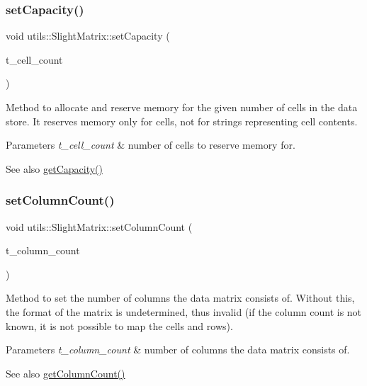 \subsubsection{\texorpdfstring{set\+Capacity()}{setCapacity()}}
{\footnotesize\ttfamily void utils\+::\+Slight\+Matrix\+::set\+Capacity (\begin{DoxyParamCaption}\item[{const size\+\_\+t}]{t\+\_\+cell\+\_\+count }\end{DoxyParamCaption})}

Method to allocate and reserve memory for the given number of cells in the data store. It reserves memory only for cells, not for strings representing cell contents. 
\begin{DoxyParams}{Parameters}
{\em t\+\_\+cell\+\_\+count} & number of cells to reserve memory for. \\
\hline
\end{DoxyParams}
\begin{DoxySeeAlso}{See also}
\hyperlink{classutils_1_1SlightMatrix_addbfd1ec641100a7cda0b4f6e39ae676}{get\+Capacity()} 
\end{DoxySeeAlso}
\mbox{\label{classutils_1_1SlightMatrix_a5f633b5225716e60a69cdca3b43f380c}} 
\subsubsection{\texorpdfstring{set\+Column\+Count()}{setColumnCount()}}
{\footnotesize\ttfamily void utils\+::\+Slight\+Matrix\+::set\+Column\+Count (\begin{DoxyParamCaption}\item[{const size\+\_\+t}]{t\+\_\+column\+\_\+count }\end{DoxyParamCaption})}

Method to set the number of columns the data matrix consists of. Without this, the format of the matrix is undetermined, thus invalid (if the column count is not known, it is not possible to map the cells and rows). 
\begin{DoxyParams}{Parameters}
{\em t\+\_\+column\+\_\+count} & number of columns the data matrix consists of. \\
\hline
\end{DoxyParams}
\begin{DoxySeeAlso}{See also}
\hyperlink{classutils_1_1SlightMatrix_aa08a3c2d096ac82b1688b1edc5bb71fd}{get\+Column\+Count()} 
\end{DoxySeeAlso}
\mbox{\label{classutils_1_1SlightMatrix_abe914aa8f3178afae99ec31502ba2d35}} 
